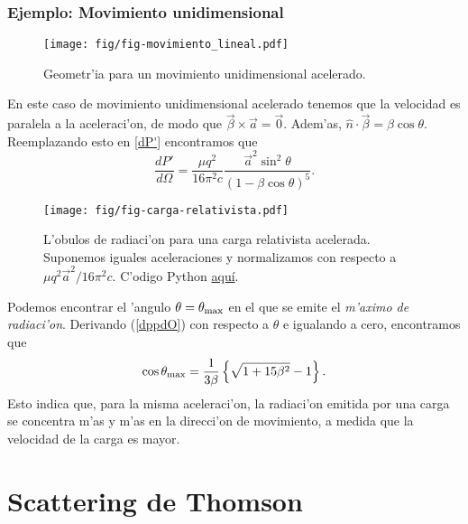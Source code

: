 \subsubsection{Ejemplo: Movimiento unidimensional}
\begin{figure}[!h]
\centerline{\texttt{[image: fig/fig-movimiento\_lineal.pdf]}}
\caption{Geometr'ia para un movimiento unidimensional acelerado.}
\label{R14}
\end{figure}
En este caso de movimiento unidimensional acelerado tenemos que la velocidad es paralela a la aceleraci'on, de modo que $\vec{\beta}\times\vec{a}=\vec{0}$. Adem'as,
$\hat{n}\cdot\vec{\beta}=\beta\cos\theta$.
Reemplazando esto en \eqref{dP'} encontramos que 
\begin{equation}
\frac{dP'}{d\Omega}=\frac{\mu q^2}{16\pi^2 c}\frac{\vec{a}^2\sin^2
\theta}{\left(1-\beta\cos\theta\right)^5}. \label{dppdO}
\end{equation}
\begin{figure}[H]
\centerline{\texttt{[image: fig/fig-carga-relativista.pdf]}}
\caption{L'obulos de radiaci'on para una carga relativista acelerada. Suponemos
iguales aceleraciones y normalizamos con respecto a ${\mu q^2\vec{a}^2}/{16\pi^2 c}$. C'odigo Python \href{https://github.com/gfrubi/electrodinamica/blob/master/figuras-editables/fig-carga-relativista.py}{aqu\'i}.}
\label{lobulo02}
\end{figure}
Podemos encontrar el 'angulo $\theta=\theta_{\rm max}$ en el que se emite el
\textit{m'aximo de radiaci'on}. Derivando (\ref{dppdO}) con respecto a $\theta$ e
igualando a cero, encontramos que
\begin{equation}
\cos\theta_{\rm max}=\frac{1}{3\beta}\left\{  \sqrt{1+15\beta^2}-1\right\}  .
\end{equation}
Esto indica que, para la misma aceleraci'on, la radiaci'on emitida por una carga se concentra m'as y m'as en la direcci'on de movimiento, a medida que la velocidad de la carga es mayor.


\section{Scattering de Thomson}


